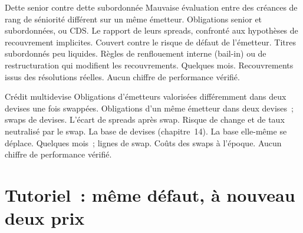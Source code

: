 \begin{strategyfile}{Dette senior contre dette subordonnée}\label{strat:s2:credit-relative-value:seniority}
 Mauvaise évaluation entre des créances de rang de séniorité différent sur un même émetteur.
 Obligations senior et subordonnées, ou CDS.
 Le rapport de leurs spreads, confronté aux hypothèses de recouvrement implicites.
 Couvert contre le risque de défaut de l'émetteur.
 Titres subordonnés peu liquides.
 Règles de renflouement interne (bail-in) ou de restructuration qui modifient les recouvrements.
 Quelques mois.
 Recouvrements issus des résolutions réelles.
 Aucun chiffre de performance vérifié.
\end{strategyfile}

\begin{strategyfile}{Crédit multidevise}\label{strat:s2:credit-relative-value:currency}
 Obligations d'émetteurs valorisées différemment dans deux devises une fois swappées.
 Obligations d'un même émetteur dans deux devises~; swaps de devises.
 L'écart de spreads après swap.
 Risque de change et de taux neutralisé par le swap.
 La base de devises (chapitre~14).
 La base elle-même se déplace.
 Quelques mois~; lignes de swap.
 Coûts des swaps à l'époque.
 Aucun chiffre de performance vérifié.
\end{strategyfile}

\section{Tutoriel~: même défaut, à nouveau deux prix}\label{tut:s2:credit-relative-value:tut}

